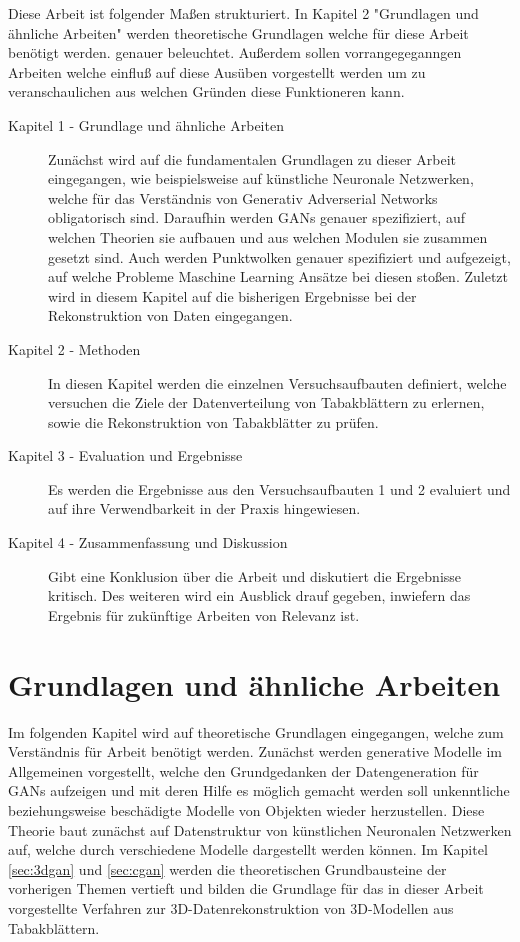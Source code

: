 \documentclass{llncs}
\begin{document}
Diese Arbeit ist folgender Maßen strukturiert. In Kapitel 2 "Grundlagen und ähnliche Arbeiten" werden theoretische Grundlagen welche für diese Arbeit benötigt werden. genauer beleuchtet. Außerdem sollen vorrangegeganngen Arbeiten welche einfluß auf diese Ausüben vorgestellt werden um zu veranschaulichen aus welchen Gründen diese Funktioneren kann.
\\
\begin{description}
\item[Kapitel 1 - Grundlage und ähnliche Arbeiten] Zunächst wird auf die fundamentalen Grundlagen zu dieser Arbeit eingegangen, wie beispielsweise auf künstliche Neuronale Netzwerken, welche für das Verständnis von Generativ Adverserial Networks obligatorisch sind. Daraufhin werden GANs genauer spezifiziert, auf welchen Theorien sie aufbauen und aus welchen Modulen sie zusammen gesetzt sind. Auch werden Punktwolken genauer spezifiziert und aufgezeigt, auf welche Probleme Maschine Learning Ansätze bei diesen stoßen. Zuletzt wird in diesem Kapitel auf die bisherigen Ergebnisse bei der Rekonstruktion von Daten eingegangen.\\
\item[Kapitel 2 - Methoden] In diesen Kapitel werden die einzelnen Versuchsaufbauten definiert, welche versuchen die Ziele der Datenverteilung von Tabakblättern zu erlernen, sowie die Rekonstruktion von Tabakblätter zu prüfen.\\
\item[Kapitel 3 - Evaluation und Ergebnisse] Es werden die Ergebnisse aus den Versuchsaufbauten 1 und 2 evaluiert und auf ihre Verwendbarkeit in der Praxis hingewiesen.\\
\item[Kapitel 4 - Zusammenfassung und Diskussion] Gibt eine Konklusion über die Arbeit und diskutiert die Ergebnisse kritisch. Des weiteren wird ein Ausblick drauf gegeben, inwiefern das Ergebnis für zukünftige Arbeiten von Relevanz ist. 
\end{description}

\section{Grundlagen und ähnliche Arbeiten}

Im folgenden Kapitel wird auf theoretische Grundlagen eingegangen, welche zum Verständnis für Arbeit benötigt werden. Zunächst werden generative Modelle im Allgemeinen vorgestellt, welche den Grundgedanken der Datengeneration für GANs aufzeigen und mit deren Hilfe es möglich gemacht werden soll unkenntliche beziehungsweise beschädigte Modelle von Objekten wieder herzustellen. Diese Theorie baut zunächst auf Datenstruktur von künstlichen Neuronalen Netzwerken auf, welche durch verschiedene Modelle dargestellt werden können. Im Kapitel \ref{sec:3dgan} und \ref{sec:cgan} werden die theoretischen Grundbausteine der vorherigen Themen vertieft und bilden die Grundlage für das in dieser Arbeit vorgestellte Verfahren zur 3D-Datenrekonstruktion von 3D-Modellen aus Tabakblättern. 
\end{document}
